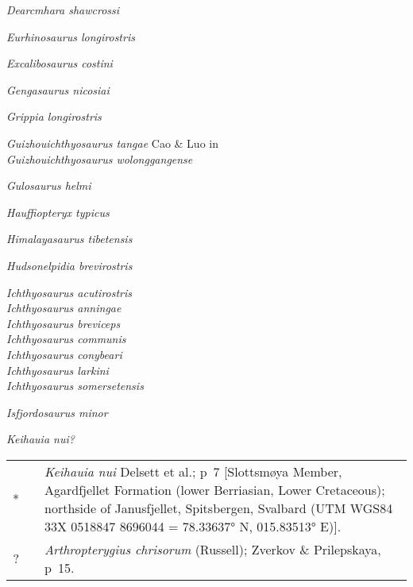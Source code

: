 \documentclass[notuftebib,font=erewhon]{tufte-lualatex}
\newenvironment*{synonymy}%
	{
		\footnotesize
		\begin{tabu}[l]{rlX}
	}%
	{
		\\
		\end{tabu}
		\normalsize
	}
\begin{document}
\emph{Dearcmhara shawcrossi} \cite*[Brusatte et al.,][]{Brusatte2015SJGa}

\emph{Eurhinosaurus longirostris} \parencite*[Mantell,][]{Mantell1851}

\emph{Excalibosaurus costini} \cite*[McGowan,][]{McGowan1986N}

\emph{Gengasaurus nicosiai} \cite*[Paparella et al.,][]{Paparella2016GM}

\emph{Grippia longirostris} \cite*[Wiman,][]{Wiman1929BGIU}

\emph{Guizhouichthyosaurus tangae} Cao \& Luo in \cite*[Yin et al.,][]{Yin2000GG}\\
\emph{Guizhouichthyosaurus wolonggangense}
    \parencite*[Chen et al.,][]{Chen2007GC}

\emph{Gulosaurus helmi} \cite*[Cuthbertson et al.,][]{Cuthbertson2013JVP}

\emph{Hauffiopteryx typicus} \cite*[Maisch,][]{Maisch2008P}

\emph{Himalayasaurus tibetensis} \cite*[Young \& Dong,][]{Young1972MNIGP}

\emph{Hudsonelpidia brevirostris} \cite*[McGowan,][]{McGowan1995CJES}

\emph{Ichthyosaurus acutirostris} \cite*[Owen,][]{Owen1840RBAAS}\\
\emph{Ichthyosaurus anningae} \cite*[Lomax \& Massare,][]{Lomax2015JVP}\\
\emph{Ichthyosaurus breviceps} \cite*[Owen,][]{Owen1881MPS}\\
\emph{Ichthyosaurus communis} \cite*[Conybeare,][]{Conybeare1822TGSL}\\
\emph{Ichthyosaurus conybeari} \cite*[Lydekker,][]{Lydekker1888GM}\\
\emph{Ichthyosaurus larkini} \cite*[Lomax \& Massare,][]{Lomax2017PP}\\
\emph{Ichthyosaurus somersetensis} \cite*[Lomax \& Massare,][]{Lomax2017PP}

\emph{Isfjordosaurus minor} \parencite*[Wiman,][]{Wiman1910BGIUa}

\emph{Keihauia nui?} \cite*[Delsett et al.,][]{Delsett2017PO} \\
\begin{synonymy}
	*	& \cite*{Delsett2017PO}	& \emph{Keihauia nui} Delsett et al.; p~7 [Slottsmøya Member, Agardfjellet Formation (lower Berriasian, Lower Cretaceous); northside of Janusfjellet, Spitsbergen, Svalbard (UTM WGS84 33X 0518847 8696044 = 78.33637° N, 015.83513° E)]. \\
	?	&	\cite*{Zverkov2019P}	&	\emph{Arthropterygius chrisorum} (Russell); Zverkov \& Prilepskaya, p~15.
\end{synonymy}
\end{document}
